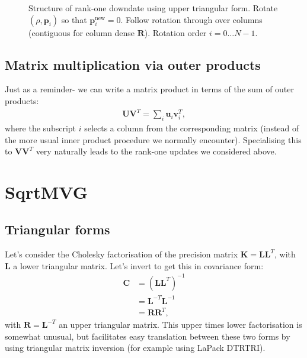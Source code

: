 \documentclass[oneside,english]{scrbook}
\begin{document}
\begin{figure}[h]
  \begin{center}
    \caption{Structure of rank-one downdate using upper triangular
      form. Rotate $(\rho,\bm{p}_i)$ so that
      $\bm{p}_i^{\text{new}}=0$. Follow rotation through over columns
      (contiguous for column dense $\bm{R}$). Rotation order $i = 0
      \ldots N-1$.} \label{fig:DDR}
  \end{center}
\end{figure}

\section{Matrix multiplication via outer products}

Just as a reminder- we can write a matrix product in terms of the sum of outer products:
\begin{align*}
  \bm{UV}^T = \sum_i \bm{u}_i\bm{v}_i^T,
\end{align*}
where the subscript $i$ selects a column from the corresponding matrix
(instead of the more usual inner product procedure we normally
encounter). Specialising this to $\bm{VV}^T$ very naturally leads to the
rank-one updates we considered above.

\chapter{SqrtMVG}

\section{Triangular forms}
Let's consider the Cholesky factorisation of the precision matrix
$\bm{K} = \bm{L}\bm{L}^T$, with $\bm{L}$ a lower triangular
matrix. Let's invert to get this in covariance form:
\begin{align*}
  \bm{C}
  &= (\bm{L}\bm{L}^T)^{-1} \\
  &= \bm{L}^{-T} \bm{L}^{-1} \\
  &= \bm{R} \bm{R}^T,
\end{align*}
with $\bm{R}=\bm{L}^{-T}$ an upper triangular matrix. This upper times
lower factorisation is somewhat unusual, but facilitates easy
translation between these two forms by using triangular matrix
inversion (for example using LaPack DTRTRI).
\end{document}
